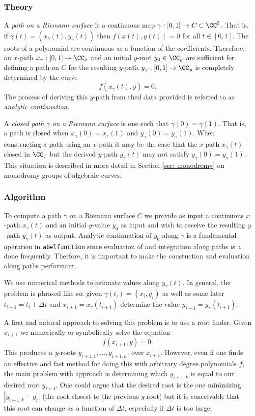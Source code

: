 %
\subsubsection*{Theory}
%

A {\it path on a Riemann surface} is a continuous map $\gamma : [0,1]
\to C \subset \CC^2$. That is, if $\gamma(t) = (x_\gamma(t),
y_\gamma(t))$ then $f(x(t),y(t)) = 0$ for all $t \in [0,1]$. The roots
of a polynomial are continuous as a function of the
coefficients. Therefore, an $x$-path $x_\gamma : [0,1] \to \CC_x$ and an
initial $y$-root $y_0 \in \CC_y$ are sufficient for defining a path on
$C$ for the resulting $y$-path $y_\gamma : [0,1] \to \CC_y$ is
completely determined by the curve
\[
    f(x_\gamma(t),y) = 0.
\]
The process of deriving this $y$-path from thed data provided is
referred to as {\it analytic continuation}.

A {\it closed path $\gamma$ on a Riemann surface} is one such that
$\gamma(0) = \gamma(1)$. That is, a path is closed when $x_\gamma(0) =
x_\gamma(1)$ and $y_\gamma(0) = y_\gamma(1)$. When constructing a path
using an $x$-path it may be the case that the $x$-path $x_\gamma(t)$
closed in $\CC_x$ but the derived $y$-path $y_\gamma(t)$ may not satisfy
$y_\gamma(0) = y_\gamma(1)$. This situation is described in more detail
in Section \ref{sec: monodromy} on monodromy groups of algebraic curves.

%
\subsubsection*{Algorithm}
%

To compute a path $\gamma$ on a Riemann surface $C$ we provide as input
a continuous $x$-path $x_\gamma(t)$ and an initial $y$-value $y_0$ as
input and wish to receive the resulting $y$-path $y_\gamma(t)$ as
output. Analytic continuation of $y_0$ along $\gamma$ is a fundamental
operation in {\tt abelfunction} since evaluation of and integration
along paths is a done frequently. Therfore, it is important to make the
constuction and evaluation along paths performant.

We use numerical methods to estimate values along $y_\gamma(t)$. In
general, the problem is phrased like so: given $\gamma(t_i) = (x_i,y_i)$
as well as some later $t_{i+1} = t_i + \Delta t$ and $x_{i+1} =
x_\gamma(t_{i+1})$ determine the value $y_{i+1} = y_\gamma(t_{i+1})$.

A first and natural approach to solving this problem is to use a root
finder. Given $x_{i+1}$ we numerically or symbolically solve the
equation
\[
    f(x_{i+1},y) = 0.
\]
This produces $n$ $y$-roots $y_{i+1,1}, \ldots, y_{i+1,n}$. over
$x_{i+1}$. However, even if one finds an effective and fast method for
doing this with arbitrary degree polynomials $f$, the main problem with
approach is determining which $y_{i+1,k}$ is equal to our desired root
$y_{i+1}$. One could argue that the desired root is the one minimizing
$|y_{i+1,k} - y_i|$ (the root closest to the previous $y$-root) but it
is conceivable that this root can change as a function of $\Delta t$,
especially if $\Delta t$ is too large.

